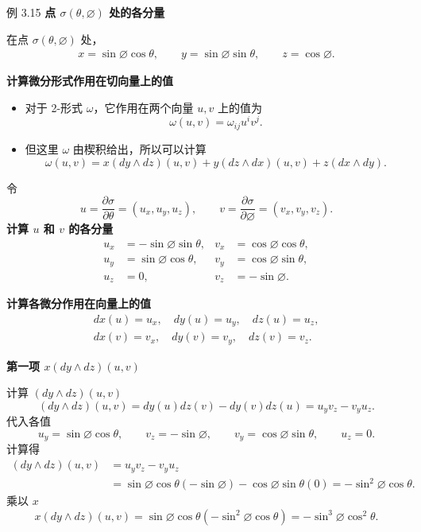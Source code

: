 \begin{statement}{例 3.15}{}
\noindent\textbf{点 $\sigma(\theta,\varnothing)$ 处的各分量}\par
在点 $\sigma(\theta,\varnothing)$ 处，
\begin{gather*}
  x=\sin\varnothing\cos\theta,\qquad
  y=\sin\varnothing\sin\theta,\qquad z=\cos\varnothing.
\end{gather*}

\noindent\textbf{计算微分形式作用在切向量上的值}
\begin{itemize}
\item 对于 2-形式 $\omega$，它作用在两个向量 $u,v$ 上的值为
\[
  \omega(u,v)=\omega_{ij}u^iv^j.
\]
\item 但这里 $\omega$ 由楔积给出，所以可以计算%
%
\[
  \omega(u,v)=x(dy\wedge dz)(u,v)+y(dz\wedge dx)(u,v)+z(dx\wedge dy).
\]
\end{itemize}

令
\[
  u=\frac{\partial\sigma}{\partial\theta}=(u_x,u_y,u_z),\qquad
  v=\frac{\partial\sigma}{\partial\varnothing}=(v_x,v_y,v_z).
\]
\noindent\textbf{计算 $u$ 和 $v$ 的各分量}
\begin{align*}
  u_x&=-\sin\varnothing\sin\theta,& v_x&=\cos\varnothing\cos\theta,\\
  u_y&=\sin\varnothing\cos\theta,& v_y&=\cos\varnothing\sin\theta,\\
  u_z&=0,& v_z&=-\sin\varnothing.
\end{align*}

\noindent\textbf{计算各微分作用在向量上的值}
\begin{gather*}
  dx(u)=u_x,\quad dy(u)=u_y,\quad dz(u)=u_z,\\
  dx(v)=v_x,\quad dy(v)=v_y,\quad dz(v)=v_z.
\end{gather*}

\noindent\textbf{第一项 $x(dy\wedge dz)(u,v)$}\par
计算 $(dy\wedge dz)(u,v)$
\[
  (dy\wedge dz)(u,v)=dy(u)dz(v)-dy(v)dz(u)=u_yv_z-v_yu_z.
\]
代入各值
\[
  u_y=\sin\varnothing\cos\theta,\qquad
  v_z=-\sin\varnothing,\qquad v_y=\cos\varnothing\sin\theta,\qquad u_z=0.
\]
计算得
\begin{align*}
  (dy\wedge dz)(u,v)&=u_yv_z-v_yu_z\\
     &=\sin\varnothing\cos\theta(-\sin\varnothing)
       -\cos\varnothing\sin\theta(0)=-\sin^2\varnothing\cos\theta.
\end{align*}
乘以 $x$
\[
  x(dy\wedge dz)(u,v)=\sin\varnothing\cos\theta(-\sin^2\varnothing\cos\theta)
  =-\sin^3\varnothing\cos^2\theta.
\]


\end{statement}
